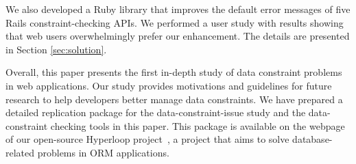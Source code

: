 We also developed a Ruby library that improves the default error messages of
five Rails constraint-checking APIs. We performed a user study with results showing that web users overwhelmingly prefer our enhancement.
The details are presented in Section \ref{sec:solution}.
 
Overall, this paper presents the first in-depth study of data constraint problems in web applications.
Our study provides motivations and guidelines for future research to help developers
better manage data constraints.   We have prepared
a detailed replication package for the data-constraint-issue study and the data-constraint checking tools  in this paper. This package is available on the webpage of our open-source Hyperloop project~\cite{hyperloop}, a
project that aims to solve database-related problems
in ORM applications.




 

